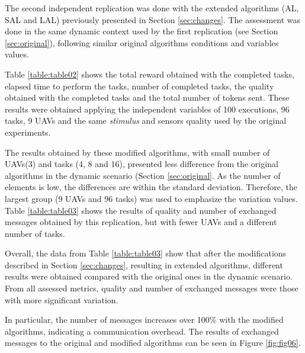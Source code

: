 The second independent replication was done with the extended algorithms (AL, SAL and LAL) previously presented in Section \ref{sec:changes}. The assessment was done in the same dynamic context used by the first replication (see Section \ref{sec:original}), following similar original algorithms conditions and variables values.

Table \ref{table:table02} shows the total reward obtained with the completed tasks, elapsed time to perform the tasks, number of completed tasks, the quality obtained with the completed tasks and the total number of tokens sent. These results were obtained applying the independent variables of 100 executions, 96 tasks, 9 UAVs and the same \textit{stimulus} and sensors quality used by the original experiments.



The results obtained by these modified algorithms, with small number of UAVs(3) and tasks (4, 8 and 16), presented less difference from the original algorithms in the dynamic scenario (Section \ref{sec:original}. As the number of elements is low, the differences are within the standard deviation. Therefore, the largest group (9 UAVs and 96 tasks) was used to emphasize the variation values. Table \ref{table:table03} shows the results of quality and number of exchanged messages obtained by this replication, but with fewer UAVs and a different number of tasks.



Overall, the data from Table \ref{table:table03} show that after the modifications described in Section \ref{sec:changes}, resulting in extended algorithms, different results were obtained  compared with the original ones in the dynamic scenario. From all assessed metrics, quality and number of exchanged messages were those with more significant variation.

In particular, the number of messages increases over 100\% with the modified algorithms, indicating a communication overhead. The results of exchanged messages to the original and modified algorithms can be seen in Figure \ref{fig:fig06}.

